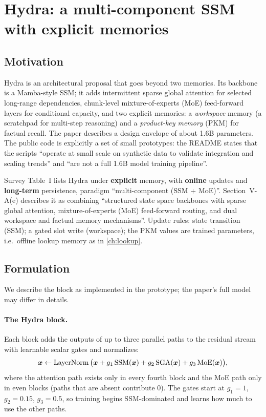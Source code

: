 \section{Hydra: a multi-component SSM with explicit memories}\label{sec:c12-hydra}

\subsection{Motivation}

Hydra \citep{chaudhary2025hydra} is an architectural proposal that goes beyond two memories. Its
backbone is a Mamba-style SSM; it adds intermittent sparse global attention for selected long-range
dependencies, chunk-level mixture-of-experts (MoE) feed-forward layers for conditional capacity,
and two explicit memories: a \emph{workspace} memory (a scratchpad for multi-step reasoning) and a
\emph{product-key memory} (PKM) for factual recall. The paper describes a design envelope of about
1.6B parameters. The public code is explicitly a set of small prototypes: the README states that
the scripts ``operate at small scale on synthetic data to validate integration and scaling
trends'' and ``are not a full 1.6B model training pipeline''.

\begin{taxonomy}
Survey Table~I \citep{zhoubian2026memory} lists Hydra under \textbf{explicit} memory, with
\textbf{online} updates and \textbf{long-term} persistence, paradigm ``multi-component (SSM + MoE)''.
Section~V-A(e) describes it as combining ``structured state space backbones with sparse global
attention, mixture-of-experts (MoE) feed-forward routing, and dual workspace and factual memory
mechanisms''. Update rules: state transition (SSM); a gated slot write (workspace); the PKM values
are trained parameters, i.e.\ offline lookup memory as in \cref{ch:lookup}.
\end{taxonomy}

\subsection{Formulation}

We describe the block as implemented in the prototype; the paper's full model may differ in
details.

\paragraph{The Hydra block.} Each block adds the outputs of up to three parallel paths to the
residual stream with learnable scalar gates and normalizes:
\begin{equation}\label{eq:c12-hydra-block}
  \bm{x} \gets \operatorname{LayerNorm}\big(\bm{x} + g_1\,\mathrm{SSM}(\bm{x}) + g_2\,\mathrm{SGA}(\bm{x}) + g_3\,\mathrm{MoE}(\bm{x})\big),
\end{equation}
where the attention path exists only in every fourth block and the MoE path only in even blocks
(paths that are absent contribute 0). The gates start at $g_1 = 1$, $g_2 = 0.15$, $g_3 = 0.5$, so
training begins SSM-dominated and learns how much to use the other paths.

